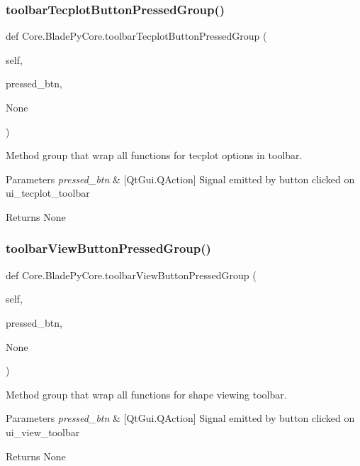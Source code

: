 \subsubsection{\texorpdfstring{toolbar\+Tecplot\+Button\+Pressed\+Group()}{toolbarTecplotButtonPressedGroup()}}
{\footnotesize\ttfamily def Core.\+Blade\+Py\+Core.\+toolbar\+Tecplot\+Button\+Pressed\+Group (\begin{DoxyParamCaption}\item[{}]{self,  }\item[{}]{pressed\+\_\+btn,  }\item[{}]{None }\end{DoxyParamCaption})}



Method group that wrap all functions for tecplot options in toolbar. 


\begin{DoxyParams}{Parameters}
{\em pressed\+\_\+btn} & \mbox{[}Qt\+Gui.\+Q\+Action\mbox{]} Signal emitted by button clicked on ui\+\_\+tecplot\+\_\+toolbar \\
\hline
\end{DoxyParams}
\begin{DoxyReturn}{Returns}
None 
\end{DoxyReturn}
\hypertarget{a00078_ade955a1fc8334b12726d9f462ed25c62}{}\label{a00078_ade955a1fc8334b12726d9f462ed25c62} 
\subsubsection{\texorpdfstring{toolbar\+View\+Button\+Pressed\+Group()}{toolbarViewButtonPressedGroup()}}
{\footnotesize\ttfamily def Core.\+Blade\+Py\+Core.\+toolbar\+View\+Button\+Pressed\+Group (\begin{DoxyParamCaption}\item[{}]{self,  }\item[{}]{pressed\+\_\+btn,  }\item[{}]{None }\end{DoxyParamCaption})}



Method group that wrap all functions for shape viewing toolbar. 


\begin{DoxyParams}{Parameters}
{\em pressed\+\_\+btn} & \mbox{[}Qt\+Gui.\+Q\+Action\mbox{]} Signal emitted by button clicked on ui\+\_\+view\+\_\+toolbar \\
\hline
\end{DoxyParams}
\begin{DoxyReturn}{Returns}
None 
\end{DoxyReturn}


